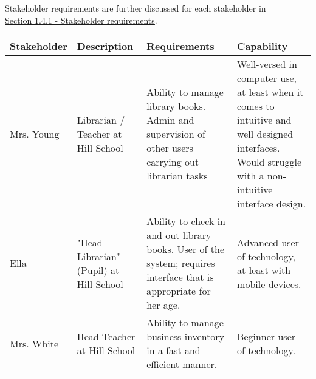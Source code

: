 \documentclass[../../../main.tex]{subfiles}
\begin{document}
Stakeholder requirements are further discussed for each stakeholder in \\
\underline{\hyperref[sec:stakeholderRequirements]{Section 1.4.1 - Stakeholder requirements}}.\\

\newcommand{\stakeholderEntry}[4]{{#1} & {#2} & {#3} & {#4}\\\hline}

\begin{tabular}{ | >{\raggedright}p{} | >{\raggedright}p{} | >{\raggedright}p{} | >{\raggedright\arraybackslash}p{} | }
    \hline
    \textbf{Stakeholder} & \textbf{Description} & \textbf{Requirements} & \textbf{Capability} \\
    \hline

    \stakeholderEntry
    {Mrs. Young}
    {Librarian / Teacher at Hill School}
    {Ability to manage library books. Admin and supervision of other users carrying out librarian tasks}
    {Well-versed in computer use, at least when it comes to intuitive and well designed interfaces. Would struggle with a non-intuitive interface design.}

    \stakeholderEntry
    {Ella}
    {"Head Librarian" (Pupil) at Hill School}
    {Ability to check in and out library books. User of the system; requires interface that is appropriate for her age.}
    {Advanced user of technology, at least with mobile devices.}

    \stakeholderEntry
    {Mrs. White}
    {Head Teacher at Hill School}
    {Ability to manage business inventory in a fast and efficient manner.}
    {Beginner user of technology.}
    \hline
\end{tabular}
\end{document}
